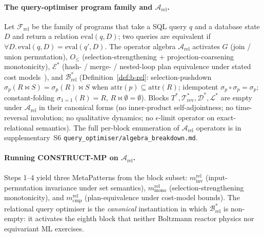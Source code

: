 \documentclass[manuscript]{acmart}
\begin{document}
\paragraph{The query-optimiser program family and $\mathcal{A}_{\mathrm{rel}}$.}
Let $\mathcal{F}_{\mathrm{rel}}$ be the family of programs that take a SQL query $q$ and a database state $D$ and return a relation $\mathrm{eval}(q, D)$; two queries are equivalent if $\forall D.\,\mathrm{eval}(q, D) = \mathrm{eval}(q', D)$. The operator algebra $\mathcal{A}_{\mathrm{rel}}$ activates $G$ (join / union permutation), $O_{\le}$ (selection-strengthening + projection-coarsening monotonicity), $\mathcal{E}^{*}$ (hash- / merge- / nested-loop plan equivalence under stated cost models~\cite{Wang2024QED, Markl2022LearnedQO}), and $\mathcal{B}^{*}_{\mathrm{rel}}$ (Definition~\ref{def:b-rel}: selection-pushdown $\sigma_p(R \bowtie S) = \sigma_p(R) \bowtie S$ when $\mathrm{attr}(p) \subseteq \mathrm{attr}(R)$; idempotent $\sigma_p \circ \sigma_p = \sigma_p$; constant-folding $\sigma_{1=1}(R) = R$, $R \bowtie \emptyset = \emptyset$). Blocks $T^{*}, \mathcal{T}^{*}_{\mathrm{rev}}, \mathcal{D}^{*}, \mathcal{L}^{*}$ are empty under $\mathcal{A}_{\mathrm{rel}}$ in their canonical forms (no inner-product self-adjointness; no time-reversal involution; no qualitative dynamics; no $\epsilon$-limit operator on exact-relational semantics). The full per-block enumeration of $\mathcal{A}_{\mathrm{rel}}$ operators is in supplementary~S6 \texttt{query\_optimiser/algebra\_breakdown.md}.

\paragraph{Running CONSTRUCT-MP on $\mathcal{A}_{\mathrm{rel}}$.}
Steps 1--4 yield three MetaPatterns from the block subset: $m^{\mathrm{rel}}_{\mathrm{inv}}$ (input-permutation invariance under set semantics), $m^{\mathrm{rel}}_{\mathrm{mono}}$ (selection-strengthening monotonicity), and $m^{\mathrm{rel}}_{\mathrm{cmp}}$ (plan-equivalence under cost-model bounds). The relational query optimiser is the \emph{canonical} instantiation in which $\mathcal{B}^{*}_{\mathrm{rel}}$ is non-empty: it activates the eighth block that neither Boltzmann reactor physics nor equivariant ML exercises.
\end{document}

